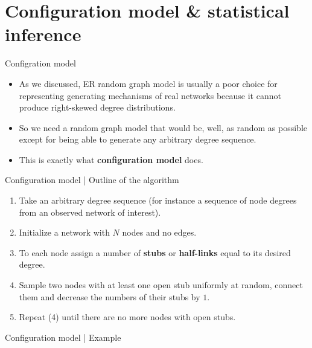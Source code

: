\documentclass[
    hyperref={colorlinks,linkcolor=blue,urlcolor=blue,citecolor=blue}
]{beamer}
\begin{document}
\section{Configuration model \& statistical inference}

\begin{frame}{Configration model}
\begin{itemize}
    \item<1-> As we discussed, ER random graph model is usually a poor
    choice for representing generating mechanisms of real networks
    because it cannot produce right-skewed degree distributions.
    \item<2-> So we need a random graph model that would be, well, as random
    as possible except for being able to generate any arbitrary degree
    sequence.
    \item<3-> This is exactly what \textbf{configuration model} does.
\end{itemize}
\end{frame}

\begin{frame}{Configuration model | Outline of the algorithm}
\begin{enumerate}
    \item<1-> Take an arbitrary degree sequence (for instance a sequence of node
    degrees from an observed network of interest).
    \item<2-> Initialize a network with $N$ nodes and no edges.
    \item<3-> To each node assign a number of \textbf{stubs} or
    \textbf{half-links} equal to its desired degree.
    \item<4-> Sample two nodes with at least one open stub uniformly at random,
    connect them and decrease the numbers of their stubs by $1$.
    \item<5-> Repeat (4) until there are no more nodes with open stubs.
\end{enumerate}
\end{frame}

\begin{frame}{Configuration model | Example}
\begin{center}
\end{center}
\end{frame}
\end{document}
